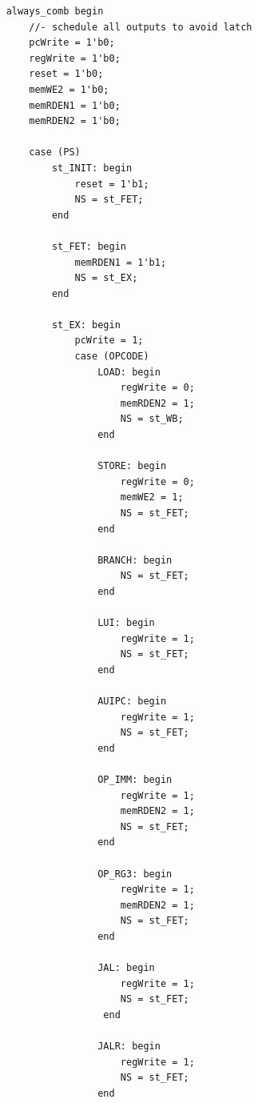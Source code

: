 \documentclass{article}
\begin{document}
\begin{verbatim}
    always_comb begin              
        //- schedule all outputs to avoid latch
        pcWrite = 1'b0;    
        regWrite = 1'b0;    
        reset = 1'b0;  
        memWE2 = 1'b0;
        memRDEN1 = 1'b0;    
        memRDEN2 = 1'b0;
                       
        case (PS)
            st_INIT: begin
                reset = 1'b1;                    
                NS = st_FET; 
            end

            st_FET: begin
                memRDEN1 = 1'b1;                    
                NS = st_EX; 
            end
              
            st_EX: begin
                pcWrite = 1;
                case (OPCODE)
                    LOAD: begin
                        regWrite = 0;
                        memRDEN2 = 1;
                        NS = st_WB;
                    end
                    
                    STORE: begin
                        regWrite = 0;
                        memWE2 = 1;
                        NS = st_FET;
                    end
                    
                    BRANCH: begin
                        NS = st_FET;
                    end
                    
                    LUI: begin
                        regWrite = 1;
                        NS = st_FET;
                    end
                    
                    AUIPC: begin
                        regWrite = 1;
                        NS = st_FET;
                    end
                      
                    OP_IMM: begin 
                        regWrite = 1;	
                        memRDEN2 = 1;
                        NS = st_FET;
                    end
                    
                    OP_RG3: begin 
                        regWrite = 1;	
                        memRDEN2 = 1;
                        NS = st_FET;
                    end
                    
                    JAL: begin
                        regWrite = 1; 
                        NS = st_FET;
                     end
                    
                    JALR: begin
                        regWrite = 1; 
                        NS = st_FET;
                    end
                     

\end{verbatim}
\end{document}

